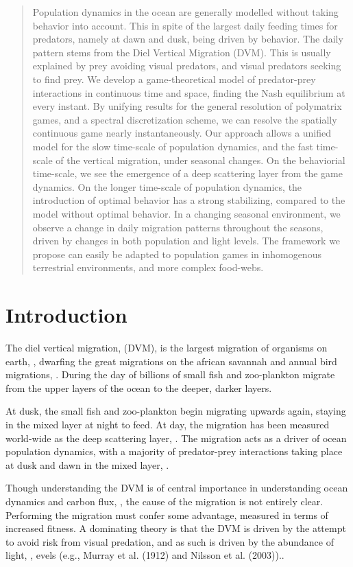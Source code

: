 \begin{abstract}

  Population dynamics in the ocean are generally modelled without taking behavior into account. This in spite of the largest daily feeding times for predators, namely at dawn and dusk, being driven by behavior. The daily pattern stems from the Diel Vertical Migration (DVM). This is usually explained by prey avoiding visual predators, and visual predators seeking to find prey. We develop a game-theoretical model of predator-prey interactions in continuous time and space, finding the Nash equilibrium at every instant. By unifying results for the general resolution of polymatrix games, and a spectral discretization scheme, we can resolve the spatially continuous game nearly instantaneously. Our approach allows a unified model for the slow time-scale of population dynamics, and the fast time-scale of the vertical migration, under seasonal changes.
  On the behaviorial time-scale, we see the emergence of a deep scattering layer from the game dynamics. On the longer time-scale of population dynamics, the introduction of optimal behavior has a strong stabilizing, compared to the model without optimal behavior. In a changing seasonal environment, we observe a change in daily migration patterns throughout the seasons, driven by changes in both population and light levels. The framework we propose can easily be adapted to population games in inhomogenous terrestrial environments, and more complex food-webs.
\end{abstract}
\section{Introduction}

The diel vertical migration, (DVM), is the largest migration of organisms on earth, \citep{}, dwarfing the great migrations on the african savannah and annual bird migrations, \citep{}. During the day of billions of small fish and zoo-plankton migrate from the upper layers of the ocean to the deeper, darker layers.

At dusk, the small fish and zoo-plankton begin migrating upwards again, staying in the mixed layer at night to feed. At day, the migration has been measured world-wide as the deep scattering layer, \citep{}. The migration acts as a driver of ocean population dynamics, with a majority of predator-prey interactions taking place at dusk and dawn in the mixed layer, \citep{}.


Though understanding the DVM is of central importance in understanding ocean dynamics and carbon flux, \citep{}, the cause of the migration is not entirely clear. Performing the migration must confer some advantage, measured in terms of increased fitness.  A dominating theory is that the DVM is driven by the attempt to avoid risk from visual predation, and as such is driven by the abundance of light, \citep{}, evels (e.g., Murray
et al. (1912) and Nilsson et al. (2003))..

